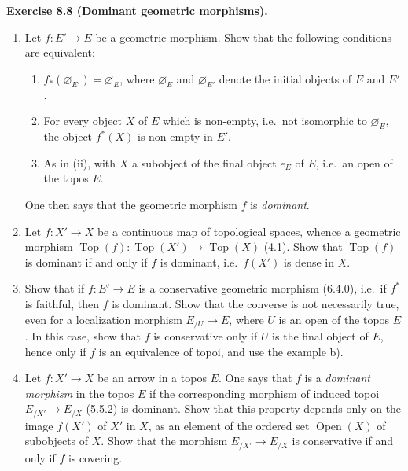 \documentclass[11pt]{article}
\newcommand{\Top}{\operatorname{Top}}
\newcommand{\ie}{i.e.}
\newenvironment{remarktext}[1]{\par\medskip\noindent\textbf{#1.}\ }{\par\medskip}
\providecommand{\ouv}{\operatorname{Open}}
\begin{document}
\begin{remarktext}{Exercise 8.8 (Dominant geometric morphisms)}
\begin{enumerate}[label=\alph*)]
\item Let \(f:E'\to E\) be a geometric morphism. Show that the following conditions are equivalent:
\begin{enumerate}[label=(\roman*)]
\item \(f_*(\varnothing_{E'})=\varnothing_E\), where \(\varnothing_E\) and \(\varnothing_{E'}\) denote the initial objects of \(E\) and \(E'\).
\item For every object \(X\) of \(E\) which is non-empty, \ie\ not isomorphic to \(\varnothing_E\), the object \(f^*(X)\) is non-empty in \(E'\).
\item As in (ii), with \(X\) a subobject of the final object \(e_E\) of \(E\), \ie\ an open of the topos \(E\).
\end{enumerate}
One then says that the geometric morphism \(f\) is \emph{dominant}.

\item Let \(f:X'\to X\) be a continuous map of topological spaces, whence a geometric morphism \(\Top(f):\Top(X')\to\Top(X)\) (4.1). Show that \(\Top(f)\) is dominant if and only if \(f\) is dominant, \ie\ \(f(X')\) is dense in \(X\).

\item Show that if \(f:E'\to E\) is a conservative geometric morphism (6.4.0), \ie\ if \(f^*\) is faithful, then \(f\) is dominant. Show that the converse is not necessarily true, even for a localization morphism \(E_{/U}\to E\), where \(U\) is an open of the topos \(E\). In this case, show that \(f\) is conservative only if \(U\) is the final object of \(E\), hence only if \(f\) is an equivalence of topoi, and use the example b).

\item Let \(f:X'\to X\) be an arrow in a topos \(E\). One says that \(f\) is a \emph{dominant morphism} in the topos \(E\) if the corresponding morphism of induced topoi \(E_{/X'}\to E_{/X}\) (5.5.2) is dominant. Show that this property depends only on the image \(f(X')\) of \(X'\) in \(X\), as an element of the ordered set \(\ouv(X)\) of subobjects of \(X\). Show that the morphism \(E_{/X'}\to E_{/X}\) is conservative if and only if \(f\) is covering.
\end{enumerate}
\end{remarktext}

\bigskip
\end{document}
